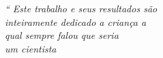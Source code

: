 \begin{epigrafe}
	\vspace*{\fill}
	\begin{flushright}
		\textit{``
		Este trabalho e seus resultados são
		\\ inteiramente dedicado a criança a 
		\\ qual sempre falou que seria 
		\\ um cientista}
	\end{flushright}
\end{epigrafe}
